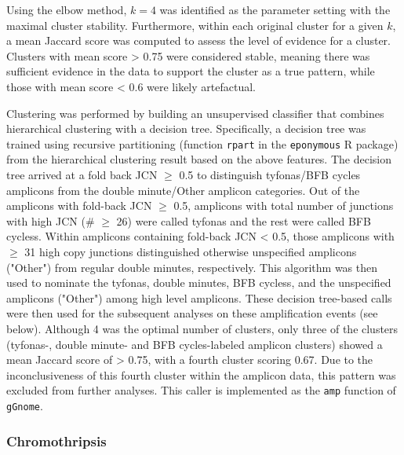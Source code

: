 \documentclass[phd,tocprelim]{cornell}
\newcommand{\ttt}[1]{\texttt{#1}}
\begin{document}
Using the elbow method, $k=4$ was identified as the parameter setting with the maximal cluster stability.  Furthermore, within each original cluster for a given $k$, a mean Jaccard score was computed to assess the level of evidence for a cluster. Clusters with mean score > 0.75 were considered stable, meaning there was sufficient evidence in the data to support the cluster as a true pattern, while those with mean score < 0.6 were likely artefactual.

Clustering was performed by building an unsupervised classifier that combines hierarchical clustering with a decision tree.  Specifically, a decision tree was trained using recursive partitioning (function \texttt{rpart} in the \texttt{eponymous} R package) from the hierarchical clustering result based on the above features. The decision tree arrived at a fold back JCN $\ge$ 0.5 to distinguish tyfonas/BFB cycles amplicons from the double minute/Other amplicon categories. Out of the amplicons with fold-back JCN $\geq$ 0.5, amplicons with total number of junctions with high JCN (\# $\geq$ 26) were called tyfonas and the rest were called BFB cycless. Within amplicons containing fold-back JCN < 0.5, those amplicons with $\geq$ 31 high copy junctions distinguished otherwise unspecified amplicons ("Other") from regular double minutes, respectively. This algorithm was then used to nominate the tyfonas, double minutes, BFB cycless, and the unspecified amplicons ("Other") among high level amplicons. These decision tree-based calls were then used for the subsequent analyses on these amplification events (see below). Although 4 was the optimal number of clusters, only three of the clusters (tyfonas-, double minute- and BFB cycles-labeled amplicon clusters) showed a mean Jaccard score of > 0.75, with a fourth cluster scoring 0.67. Due to the inconclusiveness of this fourth cluster within the amplicon data, this pattern was excluded from further analyses. This caller is implemented as the \ttt{amp} function of \ttt{gGnome}.



\subsubsection*{Chromothripsis}
\end{document}
